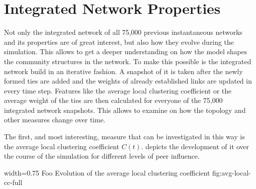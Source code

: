 

\section{Integrated Network Properties}
\label{sec:integrated-network-properties}

Not only the integrated network of all 75,000 previous instantaneous networks and its properties are of great interest, but also how they evolve during the simulation.
This allows to get a deeper understanding on how the model shapes the community structures in the network.
To make this possible is the integrated network build in an iterative fashion.
A snapshot of it is taken after the newly formed ties are added and the weights of already established links are updated in every time step.
Features like the average local clustering coefficient or the average weight of the ties are then calculated for everyone of the 75,000 integrated network snapshots.
This allows to examine on how the topology and other measures change over time.

The first, and most interesting, measure that can be investigated in this way is the average local clustering coefficient \( C(t) \).
 depicts the development of it over the course of the simulation for different levels of peer influence.


      {width=0.75\textwidth}
      {Foo}
      {Evolution of the average local clustering coefficient}
      {fig:avg-local-cc-full}

